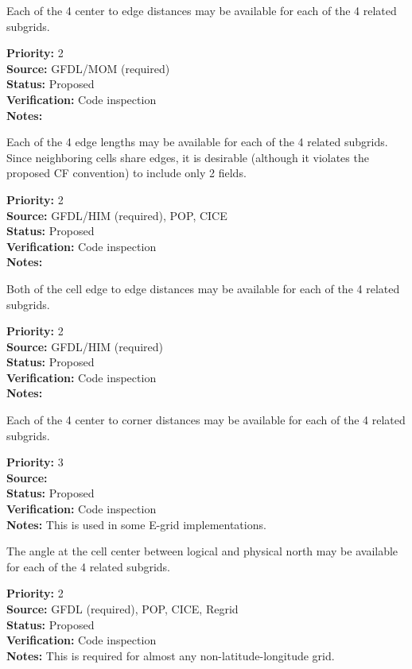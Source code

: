 Each of the 4 center to edge distances may be available for each of the 4 related
subgrids.
\begin{reqlist}
{\bf Priority:} 2 \\
{\bf Source:} GFDL/MOM (required) \\
{\bf Status:} Proposed \\
{\bf Verification:} Code inspection \\
{\bf Notes:} 
\end{reqlist}

Each of the 4 edge lengths may be available for each of the 4 related
subgrids.  Since neighboring cells share edges, it is desirable (although it violates
the proposed CF convention) to include only 2 fields.
\begin{reqlist}
{\bf Priority:} 2 \\
{\bf Source:} GFDL/HIM (required), POP, CICE \\
{\bf Status:} Proposed \\
{\bf Verification:} Code inspection \\
{\bf Notes:} 
\end{reqlist}

Both of the cell edge to edge distances may be available for each of the 4 related
subgrids.
\begin{reqlist}
{\bf Priority:} 2 \\
{\bf Source:} GFDL/HIM (required) \\
{\bf Status:} Proposed \\
{\bf Verification:} Code inspection \\
{\bf Notes:} 
\end{reqlist}

Each of the 4 center to corner distances may be available for each of the 4
related subgrids.
\begin{reqlist}
{\bf Priority:} 3 \\
{\bf Source:}  \\
{\bf Status:} Proposed \\
{\bf Verification:} Code inspection \\
{\bf Notes:} This is used in some E-grid implementations.
\end{reqlist}

The angle at the cell center between logical and physical north may be available
for each of the 4 related subgrids.
\begin{reqlist}
{\bf Priority:} 2 \\
{\bf Source:} GFDL (required), POP, CICE, Regrid \\
{\bf Status:} Proposed \\
{\bf Verification:} Code inspection \\
{\bf Notes:} This is required for almost any non-latitude-longitude grid.
\end{reqlist}

